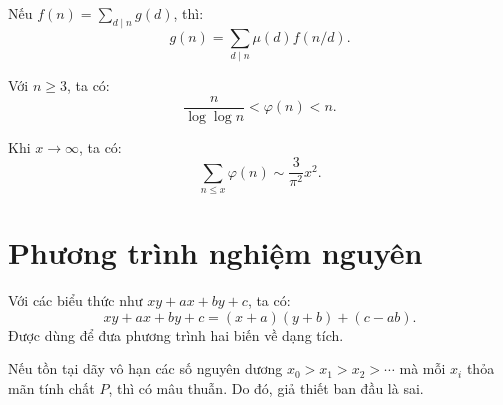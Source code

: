 \documentclass[../imo-training-open-book.tex]{subfiles}
\begin{document}
\vspace{1em}

\begin{theorem*}
    \label{theorem:mobius-inversion-arithmetic}
    Nếu \( f(n) = \sum_{d \mid n} g(d) \), thì:
    \[
        g(n) = \sum_{d \mid n} \mu(d) f(n/d).
    \]
\end{theorem*}

\vspace{1em}

\begin{theorem*}
    \label{theorem:totient-bound}
    Với \( n \ge 3 \), ta có:
    \[
        \frac{n}{\log \log n} < \varphi(n) < n.
    \]
\end{theorem*}

\vspace{1em}

\begin{theorem*}
    \label{theorem:totient-sum-asymptotic}
    Khi \( x \to \infty \), ta có:
    \[
        \sum_{n \le x} \varphi(n) \sim \frac{3}{\pi^2} x^2.
    \]
\end{theorem*}

\newpage

\section{Phương trình nghiệm nguyên}

\begin{theorem*}
    \label{theorem:simon-trick}
    Với các biểu thức như \( xy + ax + by + c \), ta có:
    \[
        xy + ax + by + c = (x + a)(y + b) + (c - ab).
    \]
    Được dùng để đưa phương trình hai biến về dạng tích.
\end{theorem*}

\vspace{1em}

\begin{lemma*}
    \label{lemma:infinite-descent}
    Nếu tồn tại dãy vô hạn các số nguyên dương \( x_0 > x_1 > x_2 > \cdots \) mà mỗi \( x_i \) thỏa mãn tính chất \( P \), thì có mâu thuẫn. Do đó, giả thiết ban đầu là sai.
\end{lemma*}

\vspace{1em}
\end{document}
